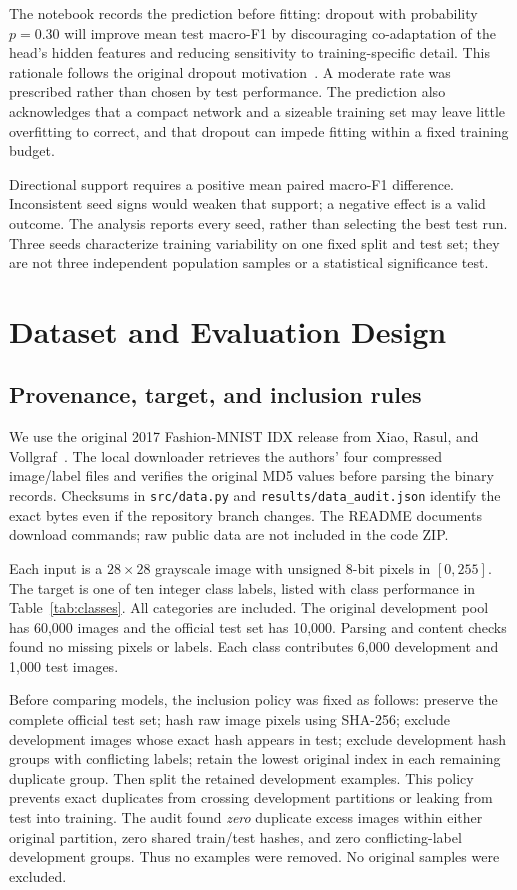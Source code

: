 \documentclass[conference]{IEEEtran}
\begin{document}
The notebook records the prediction before fitting: dropout with probability $p=0.30$ will improve mean test macro-F1 by discouraging co-adaptation of the head's hidden features and reducing sensitivity to training-specific detail. This rationale follows the original dropout motivation~\cite{dropout}. A moderate rate was prescribed rather than chosen by test performance. The prediction also acknowledges that a compact network and a sizeable training set may leave little overfitting to correct, and that dropout can impede fitting within a fixed training budget.

Directional support requires a positive mean paired macro-F1 difference. Inconsistent seed signs would weaken that support; a negative effect is a valid outcome. The analysis reports every seed, rather than selecting the best test run. Three seeds characterize training variability on one fixed split and test set; they are not three independent population samples or a statistical significance test.

\section{Dataset and Evaluation Design}
\subsection{Provenance, target, and inclusion rules}
We use the original 2017 Fashion-MNIST IDX release from Xiao, Rasul, and Vollgraf~\cite{fashion,dataset}. The local downloader retrieves the authors' four compressed image/label files and verifies the original MD5 values before parsing the binary records. Checksums in \texttt{src/data.py} and \texttt{results/data\_audit.json} identify the exact bytes even if the repository branch changes. The README documents download commands; raw public data are not included in the code ZIP.

Each input is a $28\times28$ grayscale image with unsigned 8-bit pixels in $[0,255]$. The target is one of ten integer class labels, listed with class performance in Table~\ref{tab:classes}. All categories are included. The original development pool has 60,000 images and the official test set has 10,000. Parsing and content checks found no missing pixels or labels. Each class contributes 6,000 development and 1,000 test images.

Before comparing models, the inclusion policy was fixed as follows: preserve the complete official test set; hash raw image pixels using SHA-256; exclude development images whose exact hash appears in test; exclude development hash groups with conflicting labels; retain the lowest original index in each remaining duplicate group. Then split the retained development examples. This policy prevents exact duplicates from crossing development partitions or leaking from test into training. The audit found \emph{zero} duplicate excess images within either original partition, zero shared train/test hashes, and zero conflicting-label development groups. Thus no examples were removed. No original samples were excluded.
\end{document}
